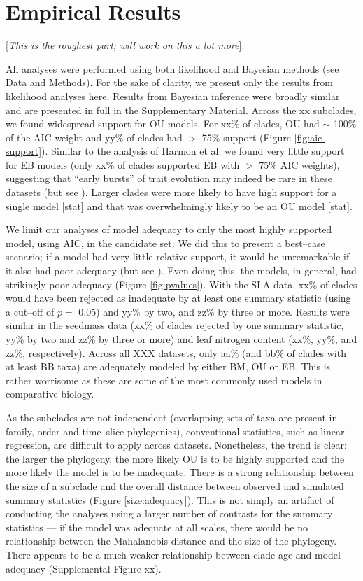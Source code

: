 \documentclass[a4paper,12pt]{article}
\begin{document}
\section{Empirical Results}

[\emph{This is the roughest part; will work on this a lot more}]:

All analyses were performed using both likelihood and Bayesian methods (see Data and Methods). For the sake of clarity, we present only the results from likelihood analyses here. Results from Bayesian inference were broadly similar and are presented in full in the Supplementary Material. Across the xx subclades, we found widespread support for OU models. For xx\% of clades, OU had $\sim$ 100\% of the AIC weight and yy\% of clades had $>$ 75\% support (Figure \ref{fig:aic-support}). Similar to the analysis of Harmon et al. \citep{Harmon2010} we found very little support for EB models (only xx\% of clades supported EB with $>$ 75\% AIC weights), suggesting that ``early bursts'' of trait evolution may indeed be rare in these datasets (but see \citep{SlaterPennell}). Larger clades were more likely to have high support for a single model [stat] and that was overwhelmingly likely to be an OU model [stat]. 

We limit our analyses of model adequacy to only the most highly supported model, using AIC, in the candidate set. We did this to present a best--case scenario; if a model had very little relative support, it would be unremarkable if it also had poor adequacy (but see \citep{Ripplinger2010}). Even doing this, the models, in general, had strikingly poor adequacy (Figure \ref{fig:pvalues}). With the SLA data, xx\% of clades would have been rejected as inadequate by at least one summary statistic (using a cut--off of $p=$ 0.05) and yy\% by two, and zz\% by three or more. Results were similar in the seedmass data (xx\% of clades rejected by one summary statistic, yy\% by two and zz\% by three or more) and leaf nitrogen content (xx\%, yy\%, and zz\%, respectively). Across all XXX datasets, only aa\% (and bb\% of clades with at least BB taxa) are adequately modeled by either BM, OU or EB. This is rather worrisome as these are some of the most commonly used models in comparative biology. 

As the subclades are not independent (overlapping sets of taxa are present in family, order and time--slice phylogenies), conventional statistics, such as linear regression, are difficult to apply across datasets. Nonetheless, the trend is clear: the larger the phylogeny, the more likely OU is to be highly supported and the more likely the model is to be inadequate. There is a strong relationship between the size of a subclade and the overall distance between observed and simulated summary statistics (Figure \ref{size:adequacy}). This is not simply an artifact of conducting the analyses using a larger number of contrasts for the summary statistics --- if the model was adequate at all scales, there would be no relationship between the Mahalanobis distance and the size of the phylogeny. There appears to be a much weaker relationship between clade age and model adequacy (Supplemental Figure xx).
\end{document}
